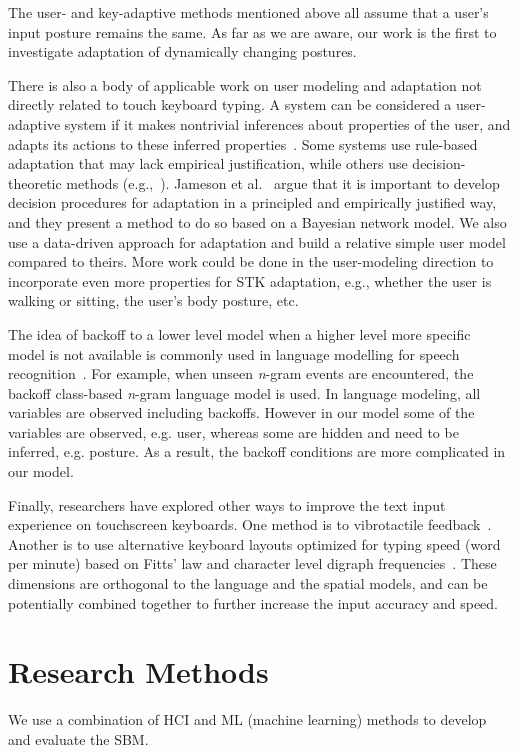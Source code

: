 \documentclass{sigchi}
\begin{document}
The user- and key-adaptive methods mentioned above all assume that a user's input posture
remains the same. As far as we are aware, our work is the first to investigate adaptation of dynamically changing postures.

There is also a body of applicable work on user modeling and adaptation not
directly related to touch keyboard typing. A system can be considered a
user-adaptive system if it makes
nontrivial inferences about properties of the user, and adapts its actions
to these inferred properties~\cite{Jameson:2000}. Some systems use rule-based
adaptation that may lack empirical justification, while others use 
decision-theoretic methods (e.g.,~\cite{Jameson:1998}). Jameson et al.~\cite{Jameson:2000} argue that it is important to develop decision procedures for adaptation in a principled and
empirically justified way, and they present a method to do so based on a
Bayesian network model. We also use a data-driven approach for adaptation and build a relative simple user model compared to theirs. More work could be done in the
user-modeling direction to incorporate even more properties for
STK adaptation, e.g., whether the user is walking or sitting, the user's body
posture, etc.

The idea of backoff to a lower level model when a higher level more specific 
model is not available is commonly used in language modelling for speech 
recognition~\cite{Katz:1987, Zitouni:2007}. For example, when unseen 
\textit{n}\mbox{-}gram events are encountered, the backoff class-based \textit{n}\mbox{-}gram 
language model is used.  In language modeling, all variables are observed including backoffs. 
However in our model some of the variables are observed, e.g. user, whereas some
are hidden and need to be inferred, e.g. posture. As a result, the backoff 
conditions are more complicated in our model.

Finally, researchers have explored other ways to improve the 
text input experience on touchscreen keyboards. One method is to vibrotactile feedback~\cite{Brewster:2007, Hoggan:2008}. 
Another is to use alternative keyboard layouts optimized for typing speed (word per minute)
based on Fitts' law and character level digraph frequencies~\cite{Zhai:2000, MacKenzie:1999}.
These dimensions are orthogonal to the language and the spatial models, and can be potentially 
combined together to further increase the input accuracy and speed.

\section{Research Methods}
We use a combination of HCI and ML (machine learning) methods to develop and evaluate the SBM.
\end{document}
